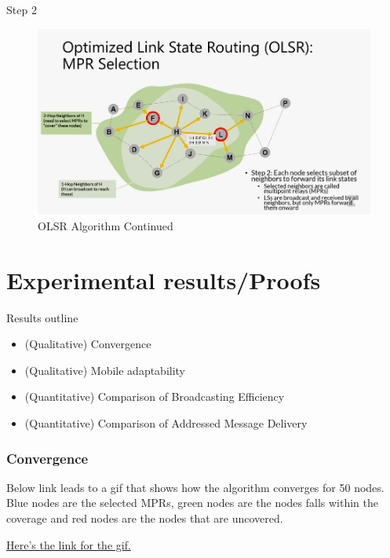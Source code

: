 \documentclass[11pt]{beamer}              %
\begin{document}
\begin{frame}{Step 2}

    \begin{figure}
        \centering
        \includegraphics[width=\textwidth]{figures/olsr10.png}
        \caption{OLSR Algorithm Continued \cite{coursera}}
    \end{figure}    
    
\end{frame}

\section{Experimental results/Proofs}

\begin{frame}{Results outline}

\begin{itemize}
    \item (Qualitative) Convergence
    \item (Qualitative) Mobile adaptability
    \item (Quantitative) Comparison of Broadcasting Efficiency
    \item (Quantitative) Comparison of Addressed Message Delivery
\end{itemize}
    
\end{frame}

\begin{frame}
\frametitle{Convergence}

Below link leads to a gif that shows how the algorithm converges for 50 nodes. Blue nodes are the selected MPRs, green nodes are the nodes falls within the coverage and red nodes are the nodes that are uncovered.

\href{https://s12.gifyu.com/images/SaIb0.gif}{Here's the link for the gif.}

\end{frame}
\end{document}
